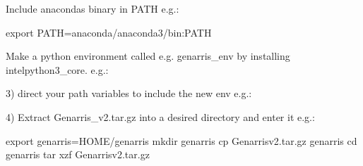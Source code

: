 \documentclass[letterpaper,10pt,english]{sphinxmanual}
\begin{document}
Include anaconda\textquotesingle{}s binary in PATH
e.g.:

\begin{sphinxVerbatim}[commandchars=\\\{\}]
export PATH=\PYGZdl{}anaconda/anaconda3/bin:\PYGZdl{}PATH
\end{sphinxVerbatim}

Make a python environment called e.g. genarris\_env by installing intelpython3\_core.
e.g.:

\begin{sphinxVerbatim}[commandchars=\\\{\}]
    
     
\end{sphinxVerbatim}

3) direct your path variables to include the new env
e.g.:

\begin{sphinxVerbatim}[commandchars=\\\{\}]
 

 
\end{sphinxVerbatim}

4) Extract Genarris\_v2.tar.gz into a desired directory and enter it
e.g.:

\begin{sphinxVerbatim}[commandchars=\\\{\}]
export \PYGZdl{}genarris=\PYGZdl{}\PYGZob{}HOME\PYGZcb{}/genarris
mkdir \PYGZdl{}genarris
cp Genarris\PYGZus{}v2.tar.gz \PYGZdl{}genarris
cd \PYGZdl{}genarris
tar \PYGZhy{}xzf Genarris\PYGZus{}v2.tar.gz
\end{sphinxVerbatim}
\end{document}
